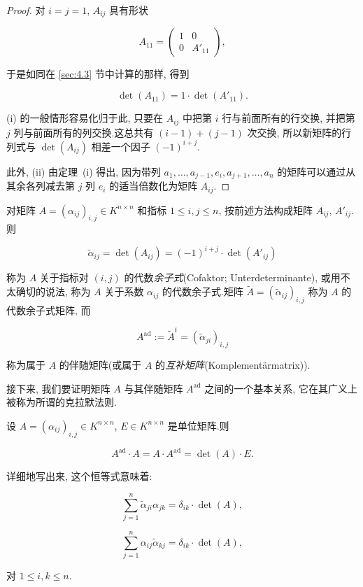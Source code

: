 \begin{proof}
对 $i = j = 1$, $A_{ij}$ 具有形状

\[
A_{11} = \begin{pmatrix} 1 & 0 \\ 0 & A'_{11} \end{pmatrix},
\]

于是如同在 \ref{sec:4.3} 节中计算的那样, 得到

\[
\det(A_{11}) = 1 \cdot \det(A'_{11}).
\]

(i) 的一般情形容易化归于此, 只要在 $A_{ij}$ 中把第 $i$ 行与前面所有的行交换, 并把第 $j$ 列与前面所有的列交换.这总共有 $(i - 1) + (j - 1)$ 次交换, 所以新矩阵的行列式与 $\det(A_{ij})$ 相差一个因子 $(-1)^{i + j}$.

此外, (ii) 由定理~(i) 得出, 因为带列 $a_1, \ldots, a_{j-1}, e_i, a_{j+1}, \ldots, a_n$ 的矩阵可以通过从其余各列减去第 $j$ 列 $e_i$ 的适当倍数化为矩阵 $A_{ij}$.
\end{proof}

\begin{definition}\label{def:4.4.2}
对矩阵 $A = (\alpha_{ij})_{i, j} \in K^{n \times n}$ 和指标 $1 \leq i, j \leq n$, 按前述方法构成矩阵 $A_{ij}$, $A'_{ij}$.则

\[
\tilde{\alpha}_{ij} = \det(A_{ij}) = (-1)^{i + j} \cdot \det(A'_{ij})
\]

称为 $A$ 关于指标对 $(i, j)$ 的代数\emph{余子式}(\textup{Cofaktor; Unterdeterminante}), 或用不太确切的说法, 称为 $A$ 关于系数 $\alpha_{ij}$ 的代数余子式.矩阵 $\tilde{A} = (\tilde{\alpha}_{ij})_{i, j}$ 称为 $A$ 的代数余子式矩阵, 而

\[
A^{\mathrm{ad}} := \tilde{A}^t = (\tilde{\alpha}_{ji})_{i, j}
\]

称为属于 $A$ 的伴随矩阵(或属于 $A$ 的\emph{互补矩阵}(\textup{Komplementärmatrix})).
\end{definition}

接下来, 我们要证明矩阵 $A$ 与其伴随矩阵 $A^{\mathrm{ad}}$ 之间的一个基本关系, 它在其广义上被称为所谓的克拉默法则.

\begin{regel}[克拉默法则]\label{reg:4.4.3}
设 $A = (\alpha_{ij})_{i, j} \in K^{n \times n}$, $E \in K^{n \times n}$ 是单位矩阵.则

\[
A^{\mathrm{ad}} \cdot A = A \cdot A^{\mathrm{ad}} = \det(A) \cdot E.
\]

详细地写出来, 这个恒等式意味着:

\[
\sum_{j = 1}^{n} \tilde{\alpha}_{ji} \alpha_{jk} = \delta_{ik} \cdot \det(A),
\]

\[
\sum_{j = 1}^{n} \alpha_{ij} \tilde{\alpha}_{kj} = \delta_{ik} \cdot \det(A),
\]

对 $1 \leq i, k \leq n$.
\end{regel}

